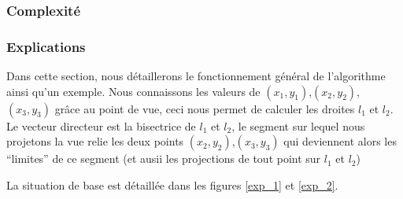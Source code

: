 \documentclass[11pt,a4paper]{article}
\theoremstyle{definition}
\theoremstyle{remark}
\begin{document}
\subsubsection{Complexité}

\subsubsection{Explications}
Dans cette section, nous détaillerons le fonctionnement général de l'algorithme ainsi qu'un exemple.
Nous connaissons les valeurs de $(x_1,y_1)$,$(x_2,y_2)$,$(x_3,y_3)$ grâce au point de vue, ceci nous permet de calculer les droites $l_1$ et $l_2$.
Le vecteur directeur est la bisectrice de $l_1$ et $l_2$, le segment sur lequel nous projetons la vue relie les deux points $(x_2,y_2)$,$(x_3,y_3)$ qui deviennent alors les "`limites"' de ce segment (et ausii les projections de tout point sur $l_1$ et $l_2$)

La situation de base est détaillée dans les figures \ref{exp_1} et \ref{exp_2}.
\end{document}
